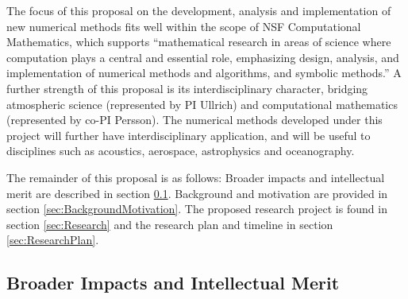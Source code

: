 \documentclass[11pt]{article}
\begin{document}
\vspace{-0.4cm}
The focus of this proposal on the development, analysis and implementation of new numerical methods fits well within the scope of NSF Computational Mathematics, which supports ``mathematical research in areas of science where computation plays a central and essential role, emphasizing design, analysis, and implementation of numerical methods and algorithms, and symbolic methods.''  A further strength of this proposal is its interdisciplinary character, bridging atmospheric science (represented by PI Ullrich) and computational mathematics (represented by co-PI Persson).  The numerical methods developed under this project will further have interdisciplinary application, and will be useful to disciplines such as acoustics, aerospace, astrophysics and oceanography.

The remainder of this proposal is as follows:  Broader impacts and intellectual merit are described in section \ref{sec:BroaderImpacts}.  Background and motivation are provided in section \ref{sec:BackgroundMotivation}.  The proposed research project is found in section \ref{sec:Research} and the research plan and timeline in section \ref{sec:ResearchPlan}.

\subsection{Broader Impacts and Intellectual Merit} \label{sec:BroaderImpacts}
\end{document}

